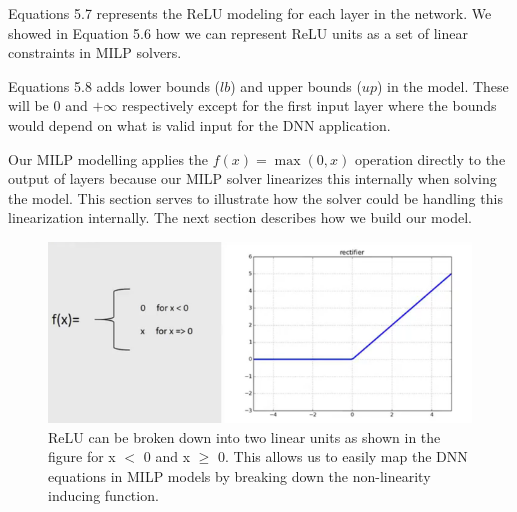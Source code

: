 

Equations 5.7 represents the ReLU modeling for each layer in the network. 
We showed in Equation 5.6 how we can represent ReLU units as a set of linear constraints in \ac{MILP} solvers.

Equations 5.8 adds lower bounds ($lb$) and upper bounds ($up$) in the model. These will be 0 and $+\infty$ respectively except for the first input layer
where the bounds would depend on what is valid input for the DNN application.

Our MILP modelling applies the $f(x) = \max(0, x)$ operation directly to the output of layers because our MILP solver linearizes this internally when solving the model.
This section serves to illustrate how the solver could be handling this linearization internally. The next section describes how we build our model.


\begin{figure}
	\centering
	\includegraphics[width=0.7\linewidth]{Images/ReLUbreakdown}
	\caption{ReLU can be broken down into two linear units as shown in the figure for x $<$ 0 and x $\geq$ 0. This allows us to easily map the DNN equations in MILP models by breaking down the non-linearity inducing function.}
	\label{fig:relubreakdown}
\end{figure}

